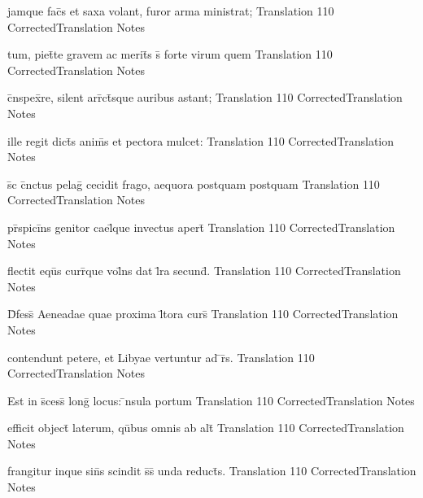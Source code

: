 \documentclass[]{book}
\begin{document}
\latline
  {jamque fac\={}s et saxa volant, furor arma ministrat;}
  { Translation }
  {110}
  { CorrectedTranslation }
  { Notes }


\latline
  {tum, piet\={}te gravem ac merit\={\macron {\i}}s s\={\macron {\i}} forte virum quem}
  { Translation }
  {110}
  { CorrectedTranslation }
  { Notes }


\latline
  {c\={}nspex\={}re, silent arr\={}ct\={\macron {\i}}sque auribus astant;}
  { Translation }
  {110}
  { CorrectedTranslation }
  { Notes }


\latline
  {ille regit dict\={\macron {\i}}s anim\={}s et pectora mulcet:}
  { Translation }
  {110}
  { CorrectedTranslation }
  { Notes }


\latline
  {s\={\macron {\i}}c c\={}nctus pelag\={\macron {\i}} cecidit frago, aequora postquam postquam}
  { Translation }
  {110}
  { CorrectedTranslation }
  { Notes }


\latline
  {pr\={}spici\={}ns genitor cael\={}que invectus apert\={}}
  { Translation }
  {110}
  { CorrectedTranslation }
  { Notes }


\latline
  {flectit equ\={}s curr\={}que vol\={}ns dat l\={}ra secund\={}.}
  { Translation }
  {110}
  { CorrectedTranslation }
  { Notes }



\latline
  {D\={}fess\={\macron {\i}} Aeneadae quae proxima l\={\macron {\i}}tora curs\={}}
  { Translation }
  {110}
  { CorrectedTranslation }
  { Notes }


\latline
  {contendunt petere, et Libyae vertuntur ad \={}r\={}s.}
  { Translation }
  {110}
  { CorrectedTranslation }
  { Notes }


\latline
  {Est in s\={}cess\={} long\={} locus: \={\macron {\i}}nsula portum}
  { Translation }
  {110}
  { CorrectedTranslation }
  { Notes }



\latline
  {efficit object\={} laterum, qu\={\macron {\i}}bus omnis ab alt\={}}
  { Translation }
  {110}
  { CorrectedTranslation }
  { Notes }


\latline
  {frangitur inque sin\={}s scindit s\={}s\={} unda reduct\={}s.}
  { Translation }
  {110}
  { CorrectedTranslation }
  { Notes }
\end{document}
